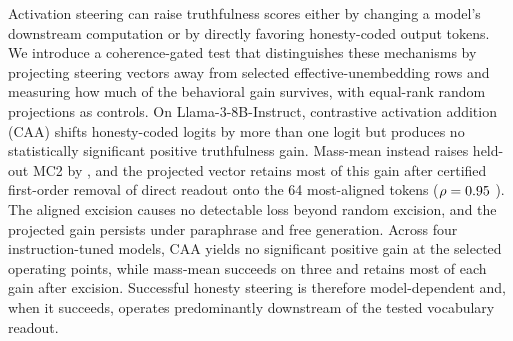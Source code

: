 Activation steering can raise truthfulness scores either by changing a model's downstream computation or by directly favoring honesty-coded output tokens. We introduce a coherence-gated test that distinguishes these mechanisms by projecting steering vectors away from selected effective-unembedding rows and measuring how much of the behavioral gain survives, with equal-rank random projections as controls. On Llama-3-8B-Instruct, contrastive activation addition (CAA) shifts honesty-coded logits by more than one logit but produces no statistically significant positive truthfulness gain. Mass-mean instead raises held-out MC2 by \MmTestDelta{}, and the projected vector retains most of this gain after certified first-order removal of direct readout onto the 64 most-aligned tokens ($\rho = 0.95$ \MmRhoAlSixtyFourCI). The aligned excision causes no detectable loss beyond random excision, and the projected gain persists under paraphrase and free generation. Across four instruction-tuned models, CAA yields no significant positive gain at the selected operating points, while mass-mean succeeds on three and retains most of each gain after excision. Successful honesty steering is therefore model-dependent and, when it succeeds, operates predominantly downstream of the tested vocabulary readout.

